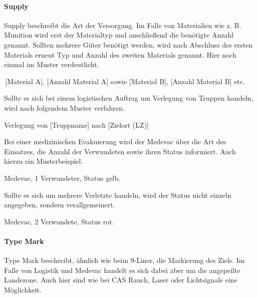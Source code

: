 \paragraph*{Supply}
Supply beschreibt die Art der Versorgung. Im Falle von Materialien wie z. B. Munition wird
erst der Materialtyp und anschließend die benötigte Anzahl genannt. Sollten mehrere
Güter benötigt werden, wird nach Abschluss des ersten Materials erneut Typ und Anzahl
des zweiten Materials genannt. Hier noch einmal im Muster verdeutlicht.
\begin{hint}
\,[Material A], [Anzahl Material A] sowie [Material B], [Anzahl Material B] etc.
\end{hint}
Sollte es sich bei einem logistischen Auftrag um Verlegung von Truppen handeln, wird
nach folgendem Muster verfahren.
\begin{hint}
Verlegung von [Truppname] nach [Zielort (LZ)]
\end{hint}
Bei einer medizinischen Evakuierung wird der Medevac über die Art des Einsatzes, die
Anzahl der Verwundeten sowie ihren Status informiert. Auch hierzu ein Musterbeispiel.
\begin{hint}
Medevac, 1 Verwundeter, Status gelb.
\end{hint}
Sollte es sich um mehrere Verletzte handeln, wird der Status nicht einzeln angegeben,
sondern verallgemeinert.
\begin{hint}
Medevac, 2 Verwundete, Status rot.
\end{hint}
\paragraph*{Type Mark}
Type Mark beschreibt, ähnlich wie beim 9-Liner, die Markierung des Ziels. Im Falle von
Logistik und Medevac handelt es sich dabei aber um die angepeilte Landezone. Auch hier
sind wie bei CAS Rauch, Laser oder Lichtsignale eine Möglichkeit.
